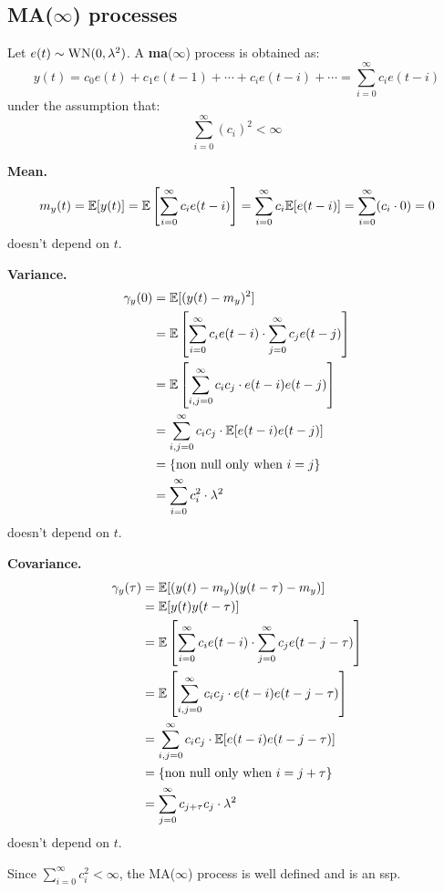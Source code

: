 \subsection{MA(\texorpdfstring{$\infty$}{infinity}) processes}

\begin{definition}
	Let $e(t) \sim \operatorname{WN}(0, \lambda^{2})$. A \textbf{\gls{ma}}($\infty$) process is obtained as:
	\[
		\boxed{y(t)=c_{0} e(t)+c_{1} e(t-1)+\cdots+c_{i} e(t-i)+\cdots=\sum_{i=0}^{\infty} c_{i} e(t-i)}
	\]
	under the assumption that:
	\[
		\sum_{i=0}^{\infty} (c_{i})^{2}<\infty
	\]
\end{definition}

\textbf{Mean.}
\[
	m_{y}(t)=\mathbb{E}[y(t)]=\mathbb{E}\left[\sum_{i=0}^{\infty} c_{i} e(t-i)\right]=\sum_{i=0}^{\infty} c_{i} \mathbb{E}[e(t-i)]=\sum_{i=0}^{\infty} (c_{i} \cdot 0) =0
\]
doesn't depend on $t$.

\textbf{Variance.}
\begin{align*}
	\gamma_{y}(0)&=\mathbb{E}[(y(t)-m_{y})^{2}]\\
	&=\mathbb{E}\left[\sum_{i=0}^{\infty} c_{i} e(t-i) \cdot \sum_{j=0}^{\infty} c_{j} e(t-j)\right]\\
	&=\mathbb{E}\left[\sum_{i, j=0}^{\infty} c_{i} c_{j} \cdot e(t-i) e(t-j)\right]\\
	&=\sum_{i, j=0}^{\infty} c_{i} c_{j} \cdot \mathbb{E}[e(t-i) e(t-j)]\\
	&=\{\text{non null only when }i=j\}\\
	&=\sum_{i=0}^{\infty} c_{i}^2 \cdot\lambda^2 
\end{align*}
doesn't depend on $t$.

\textbf{Covariance.}
\begin{align*}
	\gamma_{y}(\tau) &=\mathbb{E}[(y(t)-m_{y}) (y(t-\tau)-m_{y})]\\
	&=\mathbb{E}[y(t) y(t-\tau)]\\
	&=\mathbb{E}\left[\sum_{i=0}^{\infty} c_{i} e(t-i) \cdot \sum_{j=0}^{\infty} c_{j} e(t-j-\tau)\right]\\
	&=\mathbb{E}\left[\sum_{i, j=0}^{\infty} c_{i} c_{j} \cdot e(t-i) e(t-j-\tau)\right]\\
	&=\sum_{i, j=0}^{\infty} c_{i} c_{j} \cdot \mathbb{E}[e(t-i) e(t-j-\tau)]\\
	&=\{\text{non null only when }i=j+\tau\}\\
	&=\sum_{j=0}^{\infty} c_{j+\tau}c_{j}\cdot\lambda^2 
\end{align*}
doesn't depend on $t$.

Since $\sum_{i=0}^{\infty} c_{i}^{2}<\infty$, the MA($\infty $) process is well defined and is an \gls{ssp}.


